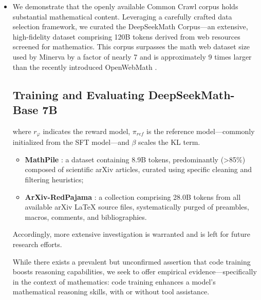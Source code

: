 \begin{itemize}[topsep=0pt]
    \item We demonstrate that the openly available Common Crawl corpus holds substantial mathematical content. Leveraging a carefully crafted data selection framework, we curated the DeepSeekMath Corpus—an extensive, high-fidelity dataset comprising 120B tokens derived from web resources screened for mathematics. This corpus surpasses the math web dataset size used by Minerva \citep{minerva} by a factor of nearly 7 and is approximately 9 times larger than the recently introduced OpenWebMath \citep{openwebmath}.

\subsection{Training and Evaluating DeepSeekMath-Base 7B}

where $r_\varphi$ indicates the reward model, $\pi_{ref}$ is the reference model—commonly initialized from the SFT model—and $\beta$ scales the KL term.

\begin{itemize}[topsep=0pt]
    \item \textbf{MathPile} \citep{mathpile}: a dataset containing 8.9B tokens, predominantly (>85\%) composed of scientific arXiv articles, curated using specific cleaning and filtering heuristics;
    \item \textbf{ArXiv-RedPajama} \citep{redpajama}: a collection comprising 28.0B tokens from all available arXiv LaTeX source files, systematically purged of preambles, macros, comments, and bibliographies.
\end{itemize}

Accordingly, more extensive investigation is warranted and is left for future research efforts.

While there exists a prevalent but unconfirmed assertion that code training boosts reasoning capabilities, we seek to offer empirical evidence—specifically in the context of mathematics: code training enhances a model’s mathematical reasoning skills, with or without tool assistance.


\end{itemize}
